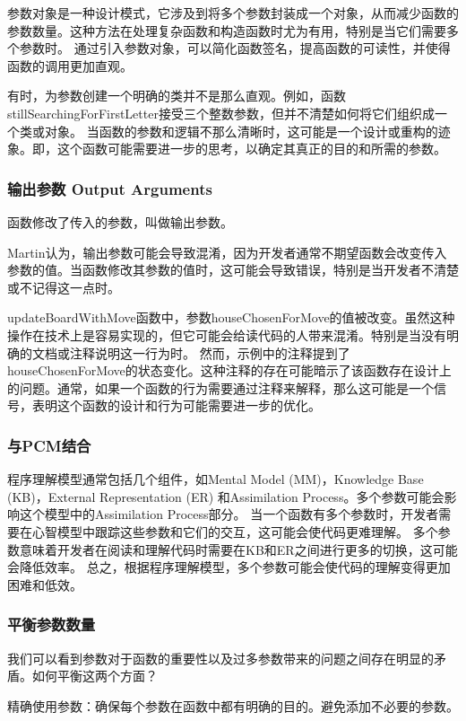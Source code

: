 参数对象是一种设计模式，它涉及到将多个参数封装成一个对象，从而减少函数的参数数量。这种方法在处理复杂函数和构造函数时尤为有用，特别是当它们需要多个参数时。
通过引入参数对象，可以简化函数签名，提高函数的可读性，并使得函数的调用更加直观。

有时，为参数创建一个明确的类并不是那么直观。例如，函数stillSearchingForFirstLetter接受三个整数参数，但并不清楚如何将它们组织成一个类或对象。
当函数的参数和逻辑不那么清晰时，这可能是一个设计或重构的迹象。即，这个函数可能需要进一步的思考，以确定其真正的目的和所需的参数。

\subsubsection{输出参数 Output Arguments}

函数修改了传入的参数，叫做输出参数。

Martin认为，输出参数可能会导致混淆，因为开发者通常不期望函数会改变传入参数的值。当函数修改其参数的值时，这可能会导致错误，特别是当开发者不清楚或不记得这一点时。

updateBoardWithMove函数中，参数houseChosenForMove的值被改变。虽然这种操作在技术上是容易实现的，但它可能会给读代码的人带来混淆。特别是当没有明确的文档或注释说明这一行为时。
然而，示例中的注释提到了houseChosenForMove的状态变化。这种注释的存在可能暗示了该函数存在设计上的问题。通常，如果一个函数的行为需要通过注释来解释，那么这可能是一个信号，表明这个函数的设计和行为可能需要进一步的优化。


\subsubsection{与PCM结合}
程序理解模型通常包括几个组件，如Mental Model (MM)，Knowledge Base (KB)，External Representation (ER) 和Assimilation Process。多个参数可能会影响这个模型中的Assimilation Process部分。
当一个函数有多个参数时，开发者需要在心智模型中跟踪这些参数和它们的交互，这可能会使代码更难理解。
多个参数意味着开发者在阅读和理解代码时需要在KB和ER之间进行更多的切换，这可能会降低效率。
总之，根据程序理解模型，多个参数可能会使代码的理解变得更加困难和低效。

\subsubsection{平衡参数数量}
我们可以看到参数对于函数的重要性以及过多参数带来的问题之间存在明显的矛盾。如何平衡这两个方面？

精确使用参数：确保每个参数在函数中都有明确的目的。避免添加不必要的参数。

